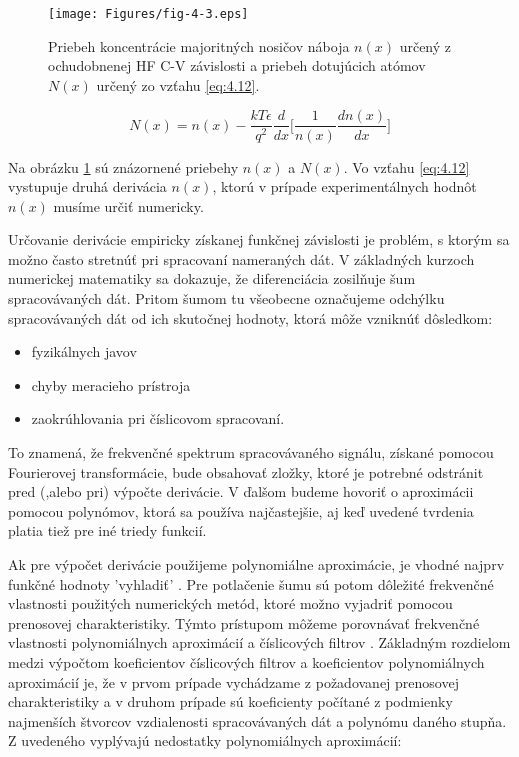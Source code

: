 \begin{figure}[h!]\centering
\texttt{[image: Figures/fig-4-3.eps]}
\captionsetup{justification=raggedright, singlelinecheck=false}
\caption[Priebeh koncentrácie majoritných nosičov náboja $n(x)$ určený
  z ochudobnenej HF C-V závislosti a priebeh dotujúcich atómov $N(x)$
  určený zo vzťahu \ref{eq:4.12}]{Priebeh koncentrácie majoritných
  nosičov náboja $n(x)$ určený z ochudobnenej HF C-V závislosti a
  priebeh dotujúcich atómov $N(x)$ určený zo vzťahu \ref{eq:4.12}.}
\label{fig:4.3}
\end{figure}

\begin{equation}\label{eq:4.12}
N(x) = n(x) - \frac{kT\epsilon}{q^{2}} \frac{d}{dx} \bigg[\frac{1}{n(x)}\frac{dn(x)}{dx}\bigg]
\end{equation}

Na obrázku \ref{fig:4.3} sú znázornené priebehy $n(x)$ a $N(x)$. Vo
vzťahu \ref{eq:4.12} vystupuje druhá derivácia $n(x)$, ktorú v prípade
experimentálnych hodnôt $n(x)$ musíme určiť numericky.

\par Určovanie derivácie empiricky získanej funkčnej závislosti je
problém, s ktorým sa možno často stretnúť pri spracovaní nameraných
dát. V základných kurzoch numerickej matematiky \cite{4.19} sa
dokazuje, že diferenciácia zosilňuje šum spracovávaných dát. Pritom
šumom tu všeobecne označujeme odchýlku spracovávaných dát od ich
skutočnej hodnoty, ktorá môže vzniknúť dôsledkom:

\begin{itemize}
\item fyzikálnych javov
\item chyby meracieho prístroja
\item zaokrúhlovania pri číslicovom spracovaní.
\end{itemize}

\par To znamená, že frekvenčné spektrum spracovávaného signálu,
získané pomocou Fourierovej transformácie, bude obsahovať zložky,
ktoré je potrebné odstránit pred (,alebo pri) výpočte derivácie. V
ďalšom budeme hovoriť o aproximácii pomocou polynómov, ktorá sa
používa najčastejšie, aj keď uvedené tvrdenia platia tiež pre iné
triedy funkcií.

\par Ak pre výpočet derivácie použijeme polynomiálne aproximácie, je
vhodné najprv funkčné hodnoty 'vyhladiť' \cite{4.20}. Pre potlačenie
šumu sú potom dôležité frekvenčné vlastnosti použitých numerických
metód, ktoré možno vyjadriť pomocou prenosovej charakteristiky. Týmto
prístupom môžeme porovnávať frekvenčné vlastnosti polynomiálnych
aproximácií a číslicových filtrov \cite{4.21}.  Základným rozdielom
medzi výpočtom koeficientov číslicových filtrov a koeficientov
polynomiálnych aproximácií je, že v prvom prípade vychádzame z
požadovanej prenosovej charakteristiky a v druhom prípade sú
koeficienty počítané z podmienky najmenších štvorcov vzdialenosti
spracovávaných dát a polynómu daného stupňa. Z uvedeného vyplývajú
nedostatky polynomiálnych aproximácií:

